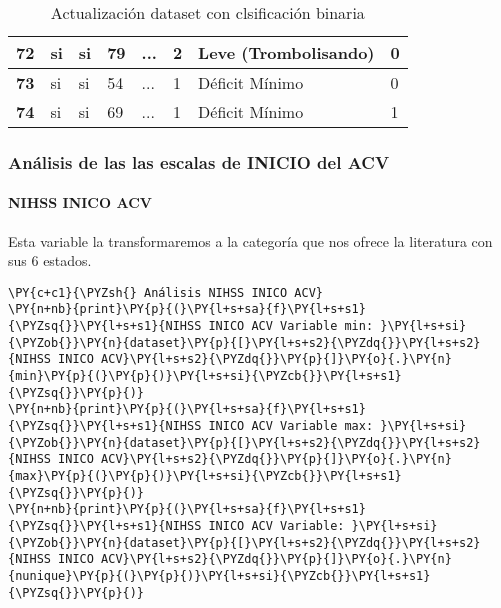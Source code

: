 \begin{table}[H]
{\begin{tabular}{|c|l|l|l|l|l|l|l|}
\textbf{72} & si & si & 79 & ... & 2 & Leve (Trombolisando) & 0 \\ \hline
\textbf{73} & si & si & 54 & ... & 1 & Déficit Mínimo & 0 \\ \hline
\textbf{74} & si & si & 69 & ... & 1 & Déficit Mínimo & 1 \\ \hline
\end{tabular}%
}
\caption{Actualización dataset con clsificación binaria}
\label{tab:Nihss estable o grave tabla}
\end{table}
        
    \hypertarget{anuxe1lisis-de-las-las-escalas-de-inicio-del-acv}{%
\subsubsection{Análisis de las las escalas de INICIO del
ACV}\label{anuxe1lisis-de-las-las-escalas-de-inicio-del-acv}}

    \hypertarget{nihss-inico-acv}{%
\paragraph{NIHSS INICO ACV}\label{nihss-inico-acv}}

Esta variable la transformaremos a la categoría que nos ofrece la
literatura con sus 6 estados.

    \begin{tcolorbox}[breakable, size=fbox, boxrule=1pt, pad at break*=1mm,colback=cellbackground, colframe=cellborder]
\begin{Verbatim}[commandchars=\\\{\}]
\PY{c+c1}{\PYZsh{} Análisis NIHSS INICO ACV}
\PY{n+nb}{print}\PY{p}{(}\PY{l+s+sa}{f}\PY{l+s+s1}{\PYZsq{}}\PY{l+s+s1}{NIHSS INICO ACV Variable min: }\PY{l+s+si}{\PYZob{}}\PY{n}{dataset}\PY{p}{[}\PY{l+s+s2}{\PYZdq{}}\PY{l+s+s2}{NIHSS INICO ACV}\PY{l+s+s2}{\PYZdq{}}\PY{p}{]}\PY{o}{.}\PY{n}{min}\PY{p}{(}\PY{p}{)}\PY{l+s+si}{\PYZcb{}}\PY{l+s+s1}{\PYZsq{}}\PY{p}{)}
\PY{n+nb}{print}\PY{p}{(}\PY{l+s+sa}{f}\PY{l+s+s1}{\PYZsq{}}\PY{l+s+s1}{NIHSS INICO ACV Variable max: }\PY{l+s+si}{\PYZob{}}\PY{n}{dataset}\PY{p}{[}\PY{l+s+s2}{\PYZdq{}}\PY{l+s+s2}{NIHSS INICO ACV}\PY{l+s+s2}{\PYZdq{}}\PY{p}{]}\PY{o}{.}\PY{n}{max}\PY{p}{(}\PY{p}{)}\PY{l+s+si}{\PYZcb{}}\PY{l+s+s1}{\PYZsq{}}\PY{p}{)}
\PY{n+nb}{print}\PY{p}{(}\PY{l+s+sa}{f}\PY{l+s+s1}{\PYZsq{}}\PY{l+s+s1}{NIHSS INICO ACV Variable: }\PY{l+s+si}{\PYZob{}}\PY{n}{dataset}\PY{p}{[}\PY{l+s+s2}{\PYZdq{}}\PY{l+s+s2}{NIHSS INICO ACV}\PY{l+s+s2}{\PYZdq{}}\PY{p}{]}\PY{o}{.}\PY{n}{nunique}\PY{p}{(}\PY{p}{)}\PY{l+s+si}{\PYZcb{}}\PY{l+s+s1}{\PYZsq{}}\PY{p}{)}
\end{Verbatim}
\end{tcolorbox}

